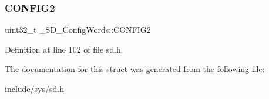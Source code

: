 \subsubsection{\texorpdfstring{CONFIG2}{CONFIG2}}
{\footnotesize\ttfamily uint32\+\_\+t \+\_\+\+S\+D\+\_\+\+Config\+Words\+::\+C\+O\+N\+F\+I\+G2}



Definition at line 102 of file sd.\+h.



The documentation for this struct was generated from the following file\+:\begin{DoxyCompactItemize}
\item 
include/sys/\mbox{\hyperlink{sd_8h}{sd.\+h}}\end{DoxyCompactItemize}
